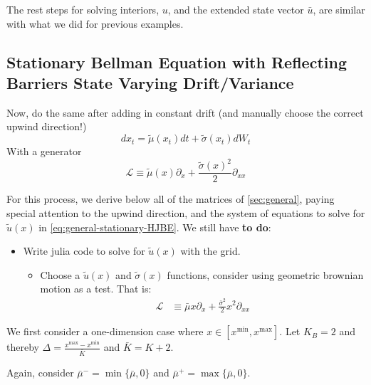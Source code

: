 \documentclass[11pt]{article}
\newcommand{\D}[1][]{\ensuremath{\partial_{#1}}}
\begin{document}
\iffalse
In this example, the matrix $P$ in \eqref{solve_u_hat_cond_1} becomes
\begin{align}
P = \frac{1}{\Delta^{2}}
\begin{bmatrix}
-X&r\Delta^2-Y&-Z&\dots&0&0&0\\
0&-X&r\Delta^2-Y&\dots&0&0&0\\
\vdots&\vdots&\vdots&\ddots&\vdots&\vdots&\vdots\\
0&0&0&\dots&r\Delta^2-Y&-Z&0\\
0&0&0&\cdots&-X&r\Delta^2-Y&-Z
\end{bmatrix}
\end{align}
\fi
The rest steps for solving interiors, $u$, and the extended state vector $\bar{u}$, are similar with what we did for previous examples.


\subsection{Stationary Bellman Equation with Reflecting Barriers State Varying Drift/Variance}
Now, do the same after adding in constant drift (and manually choose the correct upwind direction!)
$$
d x_t = \tilde{\mu}(x_t) dt + \tilde{\sigma}(x_t) d W_t
$$
With a generator
$$
\mathcal{L} \equiv \tilde{\mu}(x) \D[x] + \frac{\tilde{\sigma}(x)^2}{2}\D[xx]
$$

For this process, we derive below all of the matrices of \cref{sec:general}, paying special attention to the upwind direction, and the system of equations to solve for $\tilde{u}(x)$ in \cref{eq:general-stationary-HJBE}. We still have \textbf{to do}:
\begin{itemize}
	\item Write julia code to solve for $\tilde{u}(x)$ with the grid.
	\begin{itemize}
		\item Choose a $\tilde{u}(x)$ and $\tilde{\sigma}(x)$ functions, consider using geometric brownian motion as a test.  That is:
		\begin{align}
		\mathcal{L} &\equiv \bar{\mu} x \D[x] + \frac{\bar{\sigma}^2}{2}x^2\D[xx]
		\end{align}
	\end{itemize}
\end{itemize}

We first consider a one-dimension case where $x\in [x^{\min},x^{\max}]$. Let $K_B = 2$ and thereby $\Delta  = \frac{x^{\max}-x^{\min}}{\bar{K}}$ and $\bar{K} = K+2$.

Again, consider $\bar{\mu}^- = \min\{\bar{\mu}, 0\}$ and $\bar{\mu}^+  = \max\{\bar{\mu}, 0\}$.
\end{document}
